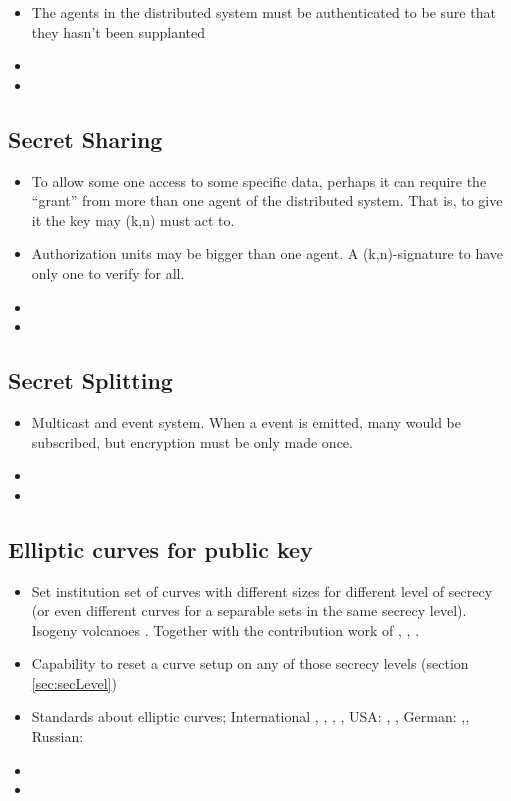 \documentclass[10pt,a4paper,twoside]{llncs}
\begin{document}
\begin{itemize}
    \item The agents in the distributed system must be authenticated to be sure that they hasn't been supplanted
    \item 
    \item 
\end{itemize}

%
\subsection{Secret Sharing \label{sec:secretSharing}}

\begin{itemize}
    \item To allow some one access to some specific data, perhaps it can require the ``grant'' from more than one agent of the distributed system. That is, to give it the key may (k,n) must act to.
    \item Authorization units may be bigger than one agent. A (k,n)-signature to have only one to verify for all.
    \item
    \item
\end{itemize}

%
\subsection{Secret Splitting \label{sec:secretSplitting}}

\begin{itemize}
    \item Multicast and event system. When a event is emitted, many would be subscribed, but encryption must be only made once.
    \item
    \item
\end{itemize}

%
\subsection{Elliptic curves for public key \label{sec:ecpk}}

\begin{itemize}
    \item Set institution set of curves with different sizes for different level of secrecy (or even different curves for a separable sets in the same secrecy level). Isogeny volcanoes \cite{secRickShareECs}. Together with the contribution work of \cite{JValera11}, \cite{Ramiro05}, \cite{Rosana11}.
    \item Capability to reset a curve setup on any of those secrecy levels (section \ref{sec:secLevel})
    \item Standards about elliptic curves; International \cite{OpenECC}, \cite{_rfc4492}, \cite{sec1}, \cite{sec2}, USA: \cite{P1363}, \cite{X9.62-1998}, German: \cite{brainpool},\cite{BSI_TR-03111}, Russian: \cite{GOSTR341001}
    \item 
    \item 
\end{itemize}
\end{document}
